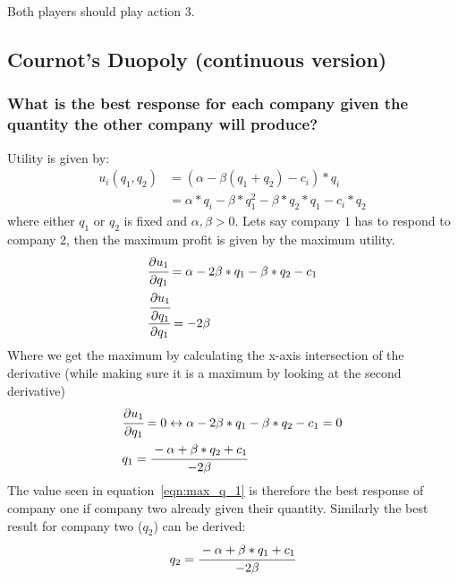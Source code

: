 \documentclass[11pt]{article}
\begin{document}
    Both players should play action 3.

    \subsection{Cournot's Duopoly (continuous version)}

    \subsubsection{What is the best response for each company given the quantity the other company will produce?}
    Utility is given by:
    \begin{equation*}
        \begin{split}
            u_i(q_1,q_2)&=(\alpha -\beta(q_1+q_2) - c_i)*q_i\\
            &=\alpha*q_i -\beta*q_1^2 -\beta*q_2*q_1 - c_i*q_2
        \end{split}
    \end{equation*}
    where either $q_1$ or $q_2$ is fixed and $\alpha, \beta>0$.
    Lets say company $1$ has to respond to company $2$, then the maximum profit is given by the maximum utility.
    \begin{align*}
        & \cfrac{\partial u_1}{\partial q_1}=\alpha - 2\beta*q_1 - \beta*q_2 - c_1\\
        & \cfrac{\cfrac{\partial u_1}{\partial q_1}}{\partial q_1}=-2\beta
    \end{align*}
    Where we get the maximum by calculating the x-axis intersection of the derivative (while making sure it is a maximum by
    looking at the second derivative)
    \begin{align}
        &\cfrac{\partial u_1}{\partial q_1}=0 \leftrightarrow \alpha - 2\beta*q_1 - \beta*q_2 - c_1=0\\
        & q_1 = \cfrac{-\alpha+\beta*q_2 + c_1}{-2\beta}
        \label{eqn:max_q_1}
    \end{align}
    The value seen in equation~\ref{eqn:max_q_1} is therefore the best response of company one if company two already
    given their quantity. Similarly the best result for company two ($q_2$) can be derived:
    \begin{equation*}
        q_2 = \cfrac{-\alpha+\beta*q_1 + c_1}{-2\beta}
    \end{equation*}
\end{document}
